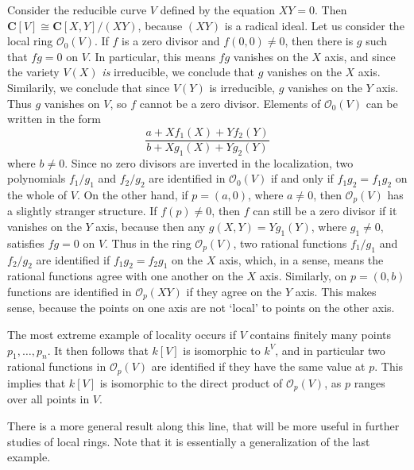 \begin{example}
    Consider the reducible curve $V$ defined by the equation $XY = 0$. Then $\mathbf{C}[V] \cong \mathbf{C}[X,Y]/(XY)$, because $(XY)$ is a radical ideal. Let us consider the local ring $\mathcal{O}_0(V)$. If $f$ is a zero divisor and $f(0,0) \neq 0$, then there is $g$ such that $fg = 0$ on $V$. In particular, this means $fg$ vanishes on the $X$ axis, and since the variety $V(X)$ {\it is} irreducible, we conclude that $g$ vanishes on the $X$ axis. Similarily, we conclude that since $V(Y)$ is irreducible, $g$ vanishes on the $Y$ axis. Thus $g$ vanishes on $V$, so $f$ cannot be a zero divisor. Elements of $\mathcal{O}_0(V)$ can be written in the form
    \[ \frac{a + Xf_1(X) + Yf_2(Y)}{b + Xg_1(X) + Yg_2(Y)} \]
    where $b \neq 0$. Since no zero divisors are inverted in the localization, two polynomials $f_1/g_1$ and $f_2/g_2$ are identified in $\mathcal{O}_0(V)$ if and only if $f_1g_2 = f_1g_2$ on the whole of $V$. On the other hand, if $p = (a,0)$, where $a \neq 0$, then $\mathcal{O}_p(V)$ has a slightly stranger structure. If $f(p) \neq 0$, then $f$ can still be a zero divisor if it vanishes on the $Y$ axis, because then any $g(X,Y) = Yg_1(Y)$, where $g_1 \neq 0$, satisfies $fg = 0$ on $V$. Thus in the ring $\mathcal{O}_p(V)$, two rational functions $f_1/g_1$ and $f_2/g_2$ are identified if $f_1g_2 = f_2g_1$ on the $X$ axis, which, in a sense, means the rational functions agree with one another on the $X$ axis. Similarly, on $p = (0,b)$ functions are identified in $\mathcal{O}_p(XY)$ if they agree on the $Y$ axis. This makes sense, because the points on one axis are not `local' to points on the other axis.
\end{example}

\begin{example}
    The most extreme example of locality occurs if $V$ contains finitely many points $p_1, \dots, p_n$. It then follows that $k[V]$ is isomorphic to $k^V$, and in particular two rational functions in $\mathcal{O}_p(V)$ are identified if they have the same value at $p$. This implies that $k[V]$ is isomorphic to the direct product of $\mathcal{O}_p(V)$, as $p$ ranges over all points in $V$.
\end{example}

There is a more general result along this line, that will be more useful in further studies of local rings. Note that it is essentially a generalization of the last example.

